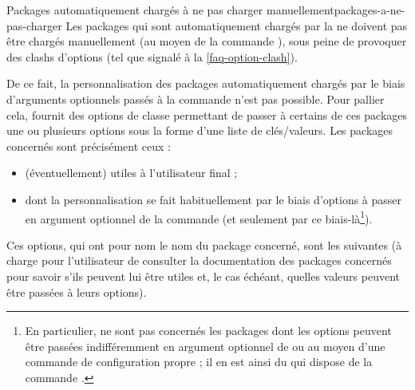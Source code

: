 \begin{dbwarning}{Packages automatiquement chargés à ne pas charger
    manuellement}{packages-a-ne-pas-charger}
  Les packages qui sont automatiquement chargés par la \yatCl{} ne doivent pas
  être chargés manuellement (au moyen de la commande
  ), sous peine de provoquer des clashs d'options (tel
  que signalé à la \vref{faq-option-clash}).
\end{dbwarning}

De ce fait, la personnalisation des packages automatiquement chargés par le
biais d'arguments optionnels passés à la commande 
n'est pas possible. Pour pallier cela, \yat{} fournit des options de classe
permettant de passer à certains de ces packages une ou plusieurs options sous
la forme d'une liste de clés/valeurs. Les packages concernés sont précisément
ceux :
\begin{itemize}
\item (éventuellement) utiles à l'utilisateur final ;
\item dont la personnalisation se fait habituellement par le biais d'options
  à passer en argument optionnel de la commande  (et
  seulement par ce biais-là\footnote{En particulier, ne sont pas concernés les
    packages dont les options peuvent être passées indifféremment en argument
    optionnel de \protect{} ou au moyen d'une commande
    de configuration propre ; il en est ainsi du  qui dispose
    de la commande \protect{}.}).
\end{itemize}
Ces options, qui ont pour nom le nom du package concerné, sont les suivantes (à
charge pour l'utilisateur de consulter la documentation des packages concernés
pour savoir s'ils peuvent lui être utiles et, le cas échéant, quelles valeurs
peuvent être passées à leurs options).

